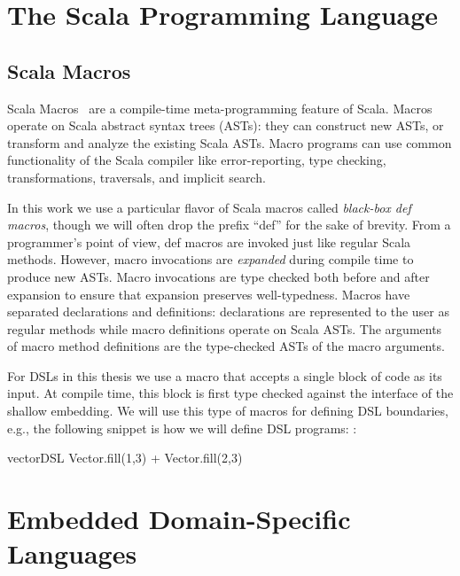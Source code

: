 \section{The Scala Programming Language}
\label{sec:scala}


\subsection{Scala Macros}
\label{sec:scala-macros}

Scala Macros~\cite{burmako_scala_2013} are a compile-time meta-programming
 feature of Scala. Macros operate on Scala abstract syntax trees (ASTs): they
 can construct new ASTs, or transform and analyze the existing Scala ASTs.
 Macro programs can use common functionality of the Scala compiler like
 error-reporting, type checking, transformations, traversals, and implicit
 search.

In this work we use a particular flavor of Scala macros called \emph{black-box def
 macros}, though we will often drop the prefix ``def'' for the
 sake of brevity.  From a programmer's point of view, def macros
 are invoked just like regular Scala methods.  However, macro
 invocations are \emph{expanded} during compile time to produce new
 ASTs.  Macro invocations are type checked both before and after
 expansion to ensure that expansion preserves well-typedness.  Macros
 have separated declarations and definitions: declarations are
 represented to the user as regular methods while macro definitions
 operate on Scala ASTs.  The arguments of macro method definitions are
 the type-checked ASTs of the macro arguments.

For DSLs in this thesis we use a macro that accepts a single block of
 code as its input. At compile time, this block is first type checked
 against the interface of the shallow embedding.  We will use this type of macros
 for defining DSL boundaries, e.g., the following snippet is how we will define DSL
 programs:
:\begin{lstparagraph}
vectorDSL {
  Vector.fill(1,3) + Vector.fill(2,3)
}
\end{lstparagraph}


\section{Embedded Domain-Specific Languages}
\label{sec:embedded-domain-specific-languages}

